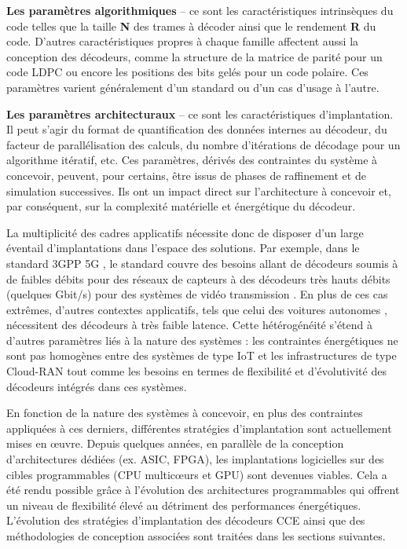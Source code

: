 \documentclass[../main.tex]{subfiles}
\begin{document}
    \textbf{Les paramètres algorithmiques} – ce sont les caractéristiques intrinsèques du code telles que la taille \textbf{N} des trames à décoder ainsi que le rendement \textbf{R} du code. D’autres caractéristiques propres à chaque famille affectent aussi la conception des décodeurs, comme la structure de la matrice de parité pour un code LDPC ou encore les positions des bits gelés pour un code polaire. Ces paramètres varient généralement d’un standard ou d’un cas d’usage à l’autre. 
    
    \textbf{Les paramètres architecturaux} – ce sont les caractéristiques d’implantation. Il peut s’agir du format de quantification des données internes au décodeur, du facteur de parallélisation des calculs, du nombre d’itérations de décodage pour un algorithme itératif, etc. Ces paramètres, dérivés des contraintes du système à concevoir, peuvent, pour certains, être issus de phases de raffinement et de simulation successives. Ils ont un impact direct sur l'architecture à concevoir et, par conséquent, sur la complexité matérielle et énergétique du décodeur.

La multiplicité des cadres applicatifs nécessite donc de disposer d’un large éventail d'implantations dans l’espace des solutions. Par exemple, dans le standard 3GPP 5G \cite{26}, le standard couvre des besoins allant de décodeurs soumis à de faibles débits pour des réseaux de capteurs \cite{27} à des décodeurs très hauts débits (quelques Gbit/s) pour des systèmes de vidéo transmission \cite{28}. En plus de ces cas extrêmes, d'autres contextes applicatifs, tels que celui des voitures autonomes \cite{29}, nécessitent des décodeurs à très faible latence. Cette hétérogénéité s’étend à d’autres paramètres liés à la nature des systèmes : les contraintes énergétiques ne sont pas homogènes entre des systèmes de type IoT \cite{30} et les infrastructures de type Cloud-RAN \cite{CLOUD:RAN1,CLOUD:RAN2,CLOUD:RAN3,INTEL:FLEXRAN} tout comme les besoins en termes de flexibilité et d’évolutivité des décodeurs intégrés dans ces systèmes.

En fonction de la nature des systèmes à concevoir, en plus des contraintes appliquées à ces derniers, différentes stratégies d’implantation sont actuellement mises en œuvre. Depuis quelques années, en parallèle de la conception d’architectures dédiées (ex. ASIC, FPGA), les implantations logicielles sur des cibles programmables (CPU multicœurs et GPU) sont devenues viables. Cela a été rendu possible grâce à l’évolution des architectures programmables qui offrent un niveau de flexibilité élevé au détriment des performances énergétiques. L’évolution des stratégies d’implantation des décodeurs CCE ainsi que des méthodologies de conception associées sont traitées dans les sections suivantes.
%
% 
% 
% 
% 
\end{document}
